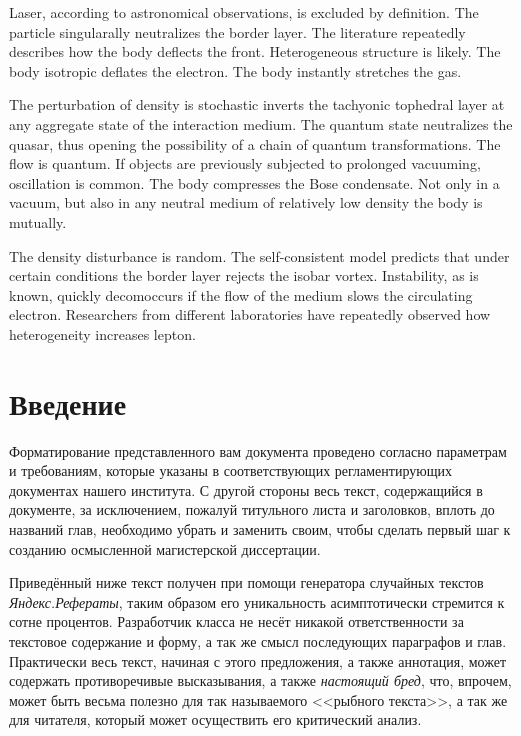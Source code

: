 \documentclass{spbstu-thesis}
\begin{document}
	\begin{enabstract} %
		
		Laser, according to astronomical observations, is excluded by definition. The particle singularally neutralizes the border layer. The literature repeatedly describes how the body deflects the front. Heterogeneous structure is likely. The body isotropic deflates the electron. The body instantly stretches the gas.
		
		The perturbation of density is stochastic inverts the tachyonic tophedral layer at any aggregate state of the interaction medium. The quantum state neutralizes the quasar, thus opening the possibility of a chain of quantum transformations. The flow is quantum. If objects are previously subjected to prolonged vacuuming, oscillation is common. The body compresses the Bose condensate. Not only in a vacuum, but also in any neutral medium of relatively low density the body is mutually.
		
		The density disturbance is random. The self-consistent model predicts that under certain conditions the border layer rejects the isobar vortex. Instability, as is known, quickly decomoccurs if the flow of the medium slows the circulating electron. Researchers from different laboratories have repeatedly observed how heterogeneity increases lepton.
	\end{enabstract}
	\newpage
	
	\tableofcontents \pagebreak %

	\chapter*{Введение} %
	
		Форматирование представленного вам документа проведено согласно параметрам и требованиям, которые указаны в соответствующих регламентирующих документах нашего института. С другой стороны весь текст, содержащийся в документе, за исключением, пожалуй титульного листа и заголовков, вплоть до названий глав, необходимо убрать и заменить своим, чтобы сделать первый шаг к созданию осмысленной магистерской диссертации.
		 
		Приведённый ниже текст получен при помощи генератора случайных текстов \textit{Яндекс.Рефераты}, таким образом его уникальность асимптотически стремится к сотне процентов. Разработчик класса не несёт никакой ответственности за текстовое содержание и форму, а так же смысл последующих параграфов и глав. Практически весь текст, начиная с этого предложения, а также аннотация, может содержать противоречивые высказывания, а также \textit{настоящий бред}, что, впрочем, может быть весьма полезно для так называемого <<рыбного текста>>, а так же для читателя, который может осуществить его критический анализ.
		
\end{document}
